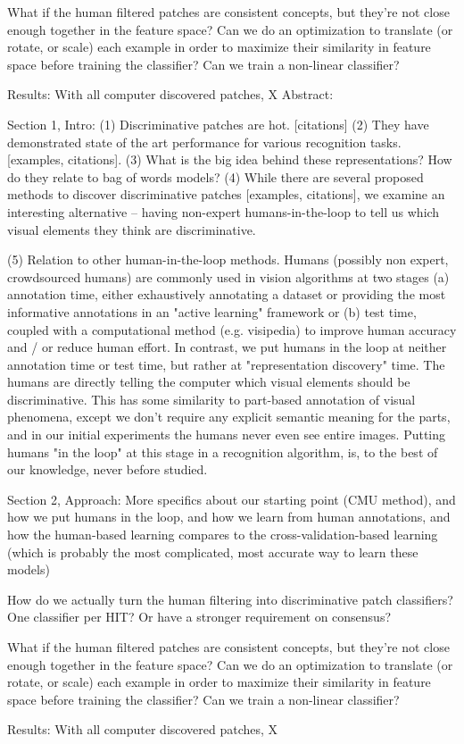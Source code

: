 \documentclass[10pt]{article}%
\begin{document}
What if the human filtered patches are consistent concepts, but they're not close enough together in the feature space? Can we do an optimization to translate (or rotate, or scale) each example in order to maximize their similarity in feature space before training the classifier? Can we train a non-linear classifier?

Results:
With all computer discovered patches, X%
Abstract:


Section 1, Intro:
(1) Discriminative patches are hot. [citations]
(2) They have demonstrated state of the art performance for various recognition tasks. [examples, citations].
(3) What is the big idea behind these representations? How do they relate to bag of words models?
(4) While there are several proposed methods to discover discriminative patches [examples, citations], we examine an interesting alternative -- having non-expert humans-in-the-loop to tell us which visual elements they think are discriminative. 

(5) Relation to other human-in-the-loop methods. Humans (possibly non expert, crowdsourced humans) are commonly used in vision algorithms at two stages (a) annotation time, either exhaustively annotating a dataset or providing the most informative annotations in an "active learning" framework or (b) test time, coupled with a computational method (e.g. visipedia) to improve human accuracy and / or reduce human effort. In contrast, we put humans in the loop at neither annotation time or test time, but rather at "representation discovery" time. The humans are directly telling the computer which visual elements should be discriminative. This has some similarity to part-based annotation of visual phenomena, except we don't require any explicit semantic meaning for the parts, and in our initial experiments the humans never even see entire images. Putting humans "in the loop" at this stage in a recognition algorithm, is, to the best of our knowledge, never before studied.

Section 2, Approach:
More specifics about our starting point (CMU method), and how we put humans in the loop, and how we learn from human annotations, and how the human-based learning compares to the cross-validation-based learning (which is probably the most complicated, most accurate way to learn these models)

How do we actually turn the human filtering into discriminative patch classifiers? One classifier per HIT? Or have a stronger requirement on consensus?

What if the human filtered patches are consistent concepts, but they're not close enough together in the feature space? Can we do an optimization to translate (or rotate, or scale) each example in order to maximize their similarity in feature space before training the classifier? Can we train a non-linear classifier?

Results:
With all computer discovered patches, X%
\end{document}
